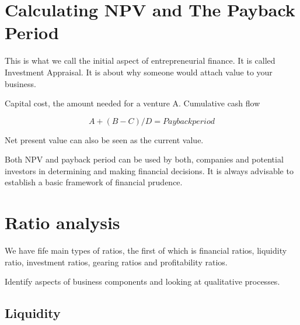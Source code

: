 \documentclass{article}
\begin{document}







\section{Calculating NPV and The Payback Period}

This is what we call the initial aspect of entrepreneurial finance.
It is called Investment Appraisal.
It is about why someone would attach value to your business.

Capital cost, the amount needed for a venture A.
Cumulative cash flow

$$A + (B-C)/D = Payback period$$

Net present value can also be seen as the current value.

Both NPV and payback period can be used by both, companies and potential investors in determining and making financial decisions.
It is always advisable to establish a basic framework of financial prudence. 

\section{Ratio analysis}

We have fife main types of ratios, the first of which is financial ratios, liquidity ratio, investment ratios, gearing ratios and profitability ratios.

Identify aspects of business components and looking at qualitative processes.

\subsection{Liquidity}
\end{document}
